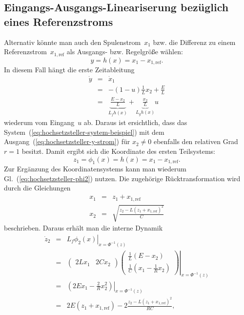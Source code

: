 \subsection{Eingangs-Ausgangs-Lineariserung bezüglich eines Referenzstroms\label{subsec:Hochsetzsteller-Ausgang-Strom}}

Alternativ könnte man auch den Spulenstrom~$x_{1}$ bzw. die Differenz
zu einem Referenzstrom~$x_{1,\text{ref}}$ als Ausgangs- bzw. Regelgröße
wählen: 
\begin{equation}
y=h(x)=x_{1}-x_{1,\text{ref}}.\label{eq:hochsetzsteller-y-strom}
\end{equation}
In diesem Fall hängt die erste Zeitableitung 
\begin{eqnarray*}
\dot{y} & = & \dot{x}_{1}\\
 & = & -(1-u)\frac{1}{L}x_{2}+\frac{E}{L}\\
 & = & \underbrace{\frac{E-x_{2}}{L}}_{{\displaystyle L_{f}h(x)}}+\underbrace{\frac{x_{2}}{L}}_{{\displaystyle L_{g}h(x)}}u
\end{eqnarray*}
wiederum vom Eingang~$u$ ab. Daraus ist ersichtlich, dass das System~(\ref{eq:hochsetzsteller-system-beispiel})
mit dem Ausgang~(\ref{eq:hochsetzsteller-y-strom}) für $x_{2}\neq0$
ebenfalls den relativen Grad $r=1$ besitzt. Damit ergibt sich die
Koordinate des ersten Teilsystems:
\[
z_{1}=\phi_{1}(x)=h(x)=x_{1}-x_{1,\text{ref}}.
\]
Zur Ergänzung des Koordinatensystems kann man wiederum Gl.~(\ref{eq:hochsetzsteller-phi2})
nutzen. Die zugehörige Rücktransformation wird durch die Gleichungen
\[
\begin{array}{lcl}
x_{1} & = & z_{1}+x_{1,\text{ref}}\\
x_{2} & = & \sqrt{\frac{z_{2}-L(z_{1}+x_{1,\text{ref}})^{2}}{C}}
\end{array}
\]
 beschrieben. Daraus erhält man die interne Dynamik
\[
\begin{array}{ccl}
\dot{z}_{2} & = & \left.L_{f}\phi_{2}(x)\right|_{x=\Phi^{-1}(z)}\\
 & = & \left.\left(\begin{array}{cc}
2Lx_{1} & 2Cx_{2}\end{array}\right)\left(\begin{array}{c}
\frac{1}{L}(E-x_{2})\\
\frac{1}{C}(x_{1}-\frac{1}{R}x_{2})
\end{array}\right)\right|_{x=\Phi^{-1}(z)}\\
 & = & \left.\left(2Ex_{1}-\frac{2}{R}x_{2}^{2}\right)\right|_{x=\Phi^{-1}(z)}\\
 & = & 2E(z_{1}+x_{1,\text{ref}})-2\frac{z_{2}-L(z_{1}+x_{1,\text{ref}})^{2}}{RC},
\end{array}
\]
